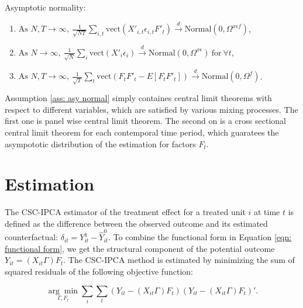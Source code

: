 \documentclass[12pt]{article}
\begin{document}
\begin{assumption}
Asymptotic normality:
\begin{enumerate}
\renewcommand*\labelenumi{(\theenumi)}
\item $\text{As } N, T \to \infty, \: \frac{1}{\sqrt{NT}} \sum_{i,t} \text{vect}\left( X'_{i,t} \epsilon_{i,t} F'_{t} \right) \xrightarrow{d} \text{Normal} \left(0, \Omega^{x\epsilon f} \right)$,
\item $\text{As } N \to \infty, \: \frac{1}{\sqrt{N}} \sum_{i} \text{vect}\left( X'_{i} \epsilon_{i} \right) \xrightarrow{d} \text{Normal} \left(0, \Omega^{x\epsilon} \right) \: \text{for} \: \forall t$,
\item $\text{As } N, T \to \infty, \: \frac{1}{\sqrt{T}} \sum_{t} \text{vect}\left( F_{t}F'_{t} - E[F_{t}F'_{t}] \right) \xrightarrow{d} \text{Normal} \left(0, \Omega^{f} \right)$.
\end{enumerate}
\label{ass: asy normal}
\end{assumption}

Assumption \ref{ass: asy normal} simply containes central limit theorems with respect to different variables, which are satisfied by various mixing processes. The first one is panel wise central limit theorem. The second on is a cross sectional central limit theorem for each contemporal time period, which guaratees the asympototic distribution of the estimation for factors $F_t$. 

\section{Estimation}
\label{sec: estimation}
The CSC-IPCA estimator of the treatment effect for a treated unit $i$ at time $t$ is defined as the difference between the observed outcome and its estimated counterfactual: $\delta_{it} = Y_{it}^1 - \hat{Y}_{it}^0$. To combine the functional form in Equation \ref{eqn: functional form}, we get the structural component of the potential outcome $Y_{it} = (X_{it}\Gamma) F_{t}$. The CSC-IPCA method is estimated by minimizing the sum of squared residuals of the following objective function:

\begin{equation}
\label{eqn: obj}
\underset{\Gamma, F_t}{\arg\min} \sum_{i} \sum_{t}\left( Y_{it} - (X_{it}\Gamma) F_{t} \right)\left( Y_{it} - (X_{it}\Gamma) F_{t} \right)'.
\end{equation}
\end{document}
